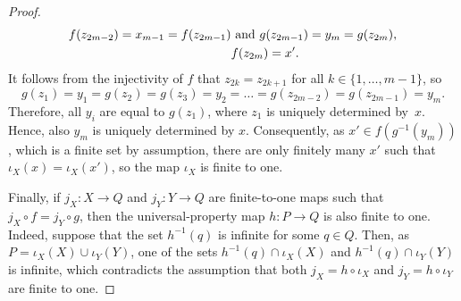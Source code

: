\documentclass[12pt,times,a4paper]{amsart}
\numberwithin{equation}{section}
\def\text{\hbox}
\numberwithin{equation}{section}
\begin{document}
\begin{proof}
\begin{align}
f(z_{2m-2})=x_{m-1}=f(z_{2m-1})&\text{ and }g(z_{2m-1})=y_{m}=g(z_{2m}),
\nonumber\\ 
&f(z_{2m})=x'.
\end{align}
It follows from the injectivity of $f$ that $z_{2k}=z_{2k+1}$ for all $k\in\{1,\ldots,m-1\}$, 
so 
\begin{equation}
g(z_1)=y_1=g(z_2)=g(z_3)=y_2=\ldots=g(z_{2m-2})=g(z_{2m-1})=y_{m}.
\end{equation}
Therefore,
all $y_i$ are equal to $g(z_1)$, where $z_1$ is uniquely determined
by~$x$. Hence, also $y_m$ is uniquely determined by $x$. Consequently, as $x'\in f(g^{-1}(y_m))$, which is a finite set by assumption, there are only finitely many $x'$ such that $\iota_X(x)=\iota_X(x')$, so the map $\iota_X$ is finite to one.

Finally, if $j_X\colon X\to Q$ and $j_Y\colon Y\to Q$ are finite-to-one maps such 
that $j_X\circ f=j_Y\circ g$, then the universal-property map $h\colon P\to Q$  is also finite to one.
Indeed, suppose that the set $h^{-1}(q)$ is infinite for some $q\in Q$. Then, as $P=\iota_X(X)\cup\iota_Y(Y)$,
one of the sets $h^{-1}(q)\cap\iota_X(X)$ and $h^{-1}(q)\cap\iota_Y(Y)$ is infinite, 
which contradicts the assumption
that both $j_X=h\circ\iota_X$ and $j_Y=h\circ\iota_Y$ are finite to one.
\end{proof}
\end{document}
